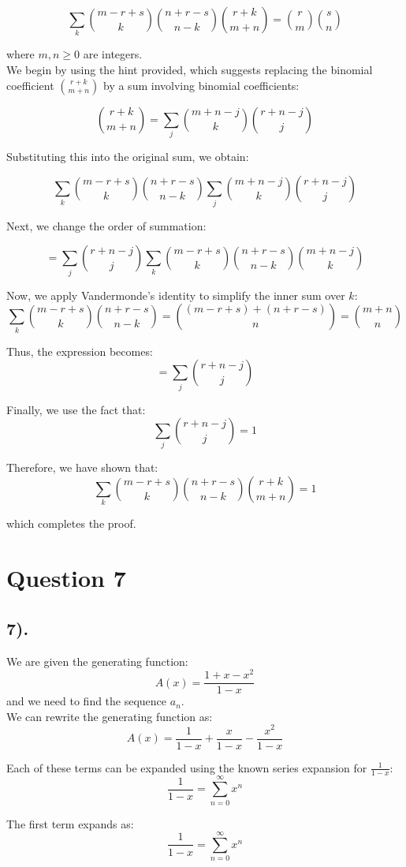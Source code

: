 \documentclass[12pt]{article}
\begin{document}
\[
\sum_k \binom{m - r + s}{k} \binom{n + r - s}{n - k} \binom{r + k}{m + n} = \binom{r}{m} \binom{s}{n}
\]

where \( m, n \geq 0 \) are integers.\\

We begin by using the hint provided, which suggests replacing the binomial coefficient \( \binom{r+k}{m+n} \) by a sum involving binomial coefficients:

\[
\binom{r+k}{m+n} = \sum_j \binom{m+n-j}{k} \binom{r+n-j}{j}
\]

Substituting this into the original sum, we obtain:

\[
\sum_k \binom{m - r + s}{k} \binom{n + r - s}{n - k} \sum_j \binom{m+n-j}{k} \binom{r+n-j}{j}
\]

Next, we change the order of summation:

\[
= \sum_j \binom{r+n-j}{j} \sum_k \binom{m - r + s}{k} \binom{n + r - s}{n - k} \binom{m+n-j}{k}
\]

Now, we apply Vandermonde's identity to simplify the inner sum over \( k \):
\[
\sum_k  \binom{m - r + s}{k}  \binom{n + r - s}{n - k} =  \binom{(m-r+s) + (n+r-s)}{n} =  \binom{m+n}{n}
\]

Thus, the expression becomes:
\[
= \sum_j  \binom{r+n-j}{j}
\]

Finally, we use the fact that:
\[
\sum_j  \binom{r+n-j}{j} = 1
\]

Therefore, we have shown that:
\[
\sum_k \binom{m - r + s}{k} \binom{n + r - s}{n - k} \binom{r+k}{m+n} = 1
\]

which completes the proof.

\section*{Question 7}
\subsection*{7).}
We are given the generating function:
\[
A(x) = \frac{1 + x - x^2}{1 - x}
\]
and we need to find the sequence \(a_n\). \\

We can rewrite the generating function as:
\[
A(x) = \frac{1}{1 - x} + \frac{x}{1 - x} - \frac{x^2}{1 - x}
\]

Each of these terms can be expanded using the known series expansion for \(\frac{1}{1 - x}\):
\[
\frac{1}{1 - x} = \sum_{n=0}^{\infty} x^n
\]

The first term expands as:
\[
\frac{1}{1 - x} = \sum_{n=0}^{\infty} x^n
\]
\end{document}
